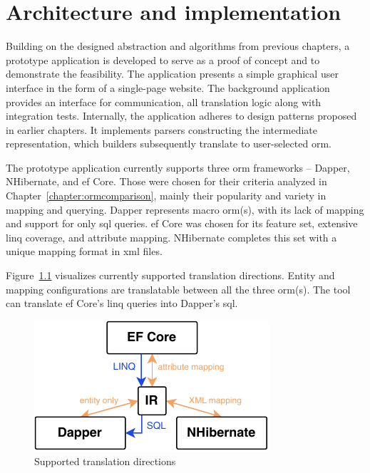 \chapter{Architecture and implementation}\label{chapter:architecture}

Building on the designed abstraction and algorithms from previous chapters, a prototype application is developed to serve as a proof of concept and to demonstrate the feasibility. The application presents a simple graphical user interface in the form of a single-page website. The background application provides an interface for communication, all translation logic along with integration tests. Internally, the application adheres to design patterns proposed in earlier chapters. It implements parsers constructing the intermediate representation, which builders subsequently translate to user-selected \acrshort{orm}.

The prototype application currently supports three \acrshort{orm} frameworks -- Dapper, NHibernate, and \acrshort{ef} Core. Those were chosen for their criteria analyzed in Chapter~\ref{chapter:ormcomparison}, mainly their popularity and variety in mapping and querying. Dapper represents macro \acrshort{orm}(s), with its lack of mapping and support for only \acrshort{sql} queries. \acrshort{ef} Core was chosen for its feature set, extensive \acrshort{linq} coverage, and attribute mapping. NHibernate completes this set with a unique mapping format in \acrshort{xml} files.

Figure~\ref{fig:supported_directions} visualizes currently supported translation directions. Entity and mapping configurations are translatable between all the three \acrshort{orm}(s). The tool can translate \acrshort{ef} Core's \acrshort{linq} queries into Dapper's \acrshort{sql}.

\begin{figure}[!htp]
  \centering
  \includegraphics[scale=1.5]{thesis/img/thesis/06_supported_directions.drawio.pdf}
  \caption{Supported translation directions}
  \label{fig:supported_directions}
\end{figure}

